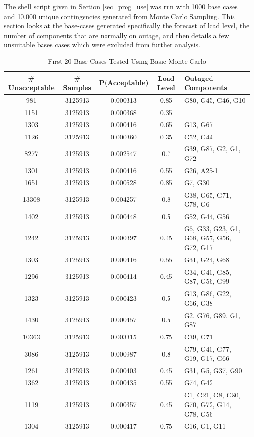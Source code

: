 \documentclass[a4paper,oneside,12pt]{report}
\begin{document}
The shell script given in Section \ref{sec_prog_use} was run with 1000 base cases and 10,000 unique contingencies generated from Monte Carlo Sampling. This section looks at the base-cases generated specifically the forecast of load level, the number of components that are normally on outage, and then details a few unsuitable bases cases which were excluded from further analysis.

\begin{table}
\caption{First 20 Base-Cases Tested Using Basic Monte Carlo}
\label{table_results_summary}
\centering
\begin{tabular}{c||c||c||c||l}
\bfseries \# Unacceptable & \bfseries \# Samples & \bfseries P(Acceptable) & \bfseries Load Level & \bfseries Outaged Components \\
\hline \hline
981   & 3125913 & 0.000313 & 0.85 & G80, G45, G46, G10  \\  
1151  & 3125913 & 0.000368 & 0.35 &   \\  
1303  & 3125913 & 0.000416 & 0.65 & G13, G67  \\  
1126  & 3125913 & 0.000360 & 0.35 & G52, G44  \\  
8277  & 3125913 & 0.002647 & 0.7  & G39, G87, G2, G1, G72  \\  
1301  & 3125913 & 0.000416 & 0.55 & G26, A25-1  \\  
1651  & 3125913 & 0.000528 & 0.85 & G7, G30  \\  
13308 & 3125913 & 0.004257 & 0.8  & G38, G65, G71, G78, G6  \\  
1402  & 3125913 & 0.000448 & 0.5  & G52, G44, G56  \\  
1242  & 3125913 & 0.000397 & 0.45 & G6, G33, G23, G1, G68, G57, G56, G72, G17  \\  
1303  & 3125913 & 0.000416 & 0.55 & G31, G24, G68  \\  
1296  & 3125913 & 0.000414 & 0.45 & G34, G40, G85, G87, G56, G99  \\  
1323  & 3125913 & 0.000423 & 0.5  & G13, G86, G22, G66, G38  \\  
1430  & 3125913 & 0.000457 & 0.5  & G2, G76, G89, G1, G87  \\  
10363 & 3125913 & 0.003315 & 0.75 & G39, G71  \\  
3086  & 3125913 & 0.000987 & 0.8  & G79, G40, G77, G19, G17, G66  \\  
1261  & 3125913 & 0.000403 & 0.45 & G31, G5, G37, G90  \\  
1362  & 3125913 & 0.000435 & 0.55 & G74, G42  \\  
1119  & 3125913 & 0.000357 & 0.45 & G1, G21, G8, G80, G70, G72, G14, G78, G56  \\  
1304  & 3125913 & 0.000417 & 0.75 & G16, G1, G11  \\  
\hline
\end{tabular}\\
\end{table}
\end{document}

